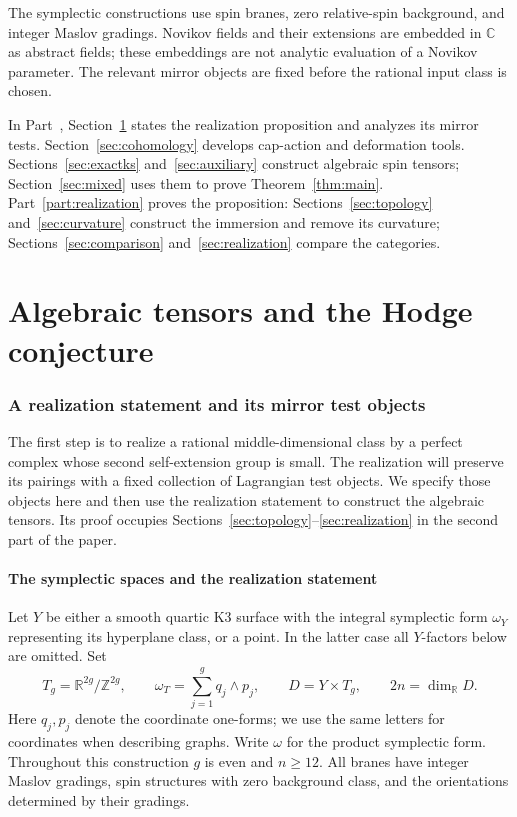 \documentclass[11pt]{article}
\numberwithin{equation}{section}
\theoremstyle{definition}
\theoremstyle{remark}
\newcommand{\R}{\mathbb R}
\newcommand{\C}{\mathbb C}
\newcommand{\Z}{\mathbb Z}
\begin{document}
The symplectic constructions use spin branes, zero relative-spin
background, and integer Maslov gradings.  Novikov fields and their
extensions are embedded in \(\C\) as abstract fields; these embeddings
are not analytic evaluation of a Novikov parameter.  The relevant
mirror objects are fixed before the rational input class is chosen.

In Part~\ref{part:algebraic}, Section~\ref{sec:setup} states the
realization proposition and analyzes its mirror tests.
Section~\ref{sec:cohomology} develops cap-action and deformation tools.
Sections~\ref{sec:exactks} and~\ref{sec:auxiliary} construct algebraic
spin tensors; Section~\ref{sec:mixed} uses them to prove
Theorem~\ref{thm:main}.  Part~\ref{part:realization} proves the proposition:
Sections~\ref{sec:topology} and~\ref{sec:curvature} construct the
immersion and remove its curvature; Sections~\ref{sec:comparison}
and~\ref{sec:realization} compare the categories.


\part{Algebraic tensors and the Hodge conjecture}
\label{part:algebraic}
\section{A realization statement and its mirror test objects}
\label{sec:setup}

The first step is to realize a rational middle-dimensional class by a
perfect complex whose second self-extension group is small.  The
realization will preserve its pairings with a fixed collection of
Lagrangian test objects.  We specify those objects here and then use the
realization statement to construct the algebraic tensors.  Its proof occupies
Sections~\ref{sec:topology}--\ref{sec:realization} in the second part
of the paper.

\subsection{The symplectic spaces and the realization statement}

Let $Y$ be either a smooth quartic K3 surface with the integral
symplectic form $\omega_Y$ representing its hyperplane class, or a point.
In the latter case all $Y$-factors below are omitted.  Set
\begin{equation}
 T_g=\R^{2g}/\Z^{2g},\qquad
 \omega_T=\sum_{j=1}^g q_j\wedge p_j,\qquad
 D=Y\times T_g,\qquad 2n=\dim_{\R}D.
 \label{setup:spaces}
\end{equation}
Here $q_j,p_j$ denote the coordinate one-forms; we use the same letters
for coordinates when describing graphs.  Write $\omega$ for the product
symplectic form.  Throughout this construction $g$ is even and $n\ge12$.
All branes have integer Maslov gradings, spin structures with zero
background class, and the orientations determined by their gradings.
\end{document}

